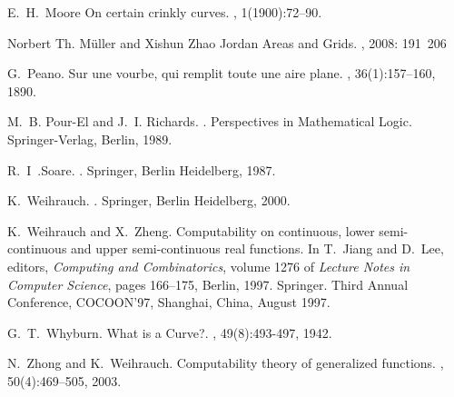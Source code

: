 \documentclass{LMCS}
\theoremstyle{plain}
\begin{document}
\begin{thebibliography}{10}
E.~H.~Moore
\newblock On certain crinkly curves.
, 1(1900):72--90.

Norbert Th. M\"uller and Xishun Zhao
\newblock Jordan Areas and Grids.
, 2008: 191~206

G.~Peano.
\newblock Sur une vourbe, qui remplit toute une aire plane.
, 36(1):157--160, 1890.

M.~B. Pour-El and J.~I. Richards.
.
\newblock Perspectives in Mathematical Logic. Springer-Verlag, Berlin, 1989.

R.~I~.Soare.
.
\newblock Springer, Berlin Heidelberg, 1987.

K.~Weihrauch.
.
\newblock Springer, Berlin Heidelberg, 2000.

K.~Weihrauch and X.~Zheng.
\newblock Computability on continuous, lower semi-continuous and upper
  semi-continuous real functions.
\newblock In T.~Jiang and D.~Lee, editors, {\em Computing and Combinatorics},
  volume 1276 of {\em Lecture Notes in Computer Science}, pages 166--175,
  Berlin, 1997. Springer.
\newblock Third Annual Conference, COCOON'97, Shanghai, China, August 1997.

G.~T.~Whyburn.
\newblock What is a Curve?.
, 49(8):493-497, 1942.

N.~Zhong and K.~Weihrauch.
\newblock Computability theory of generalized functions.
, 50(4):469--505, 2003.

\end{thebibliography}
\end{document}
